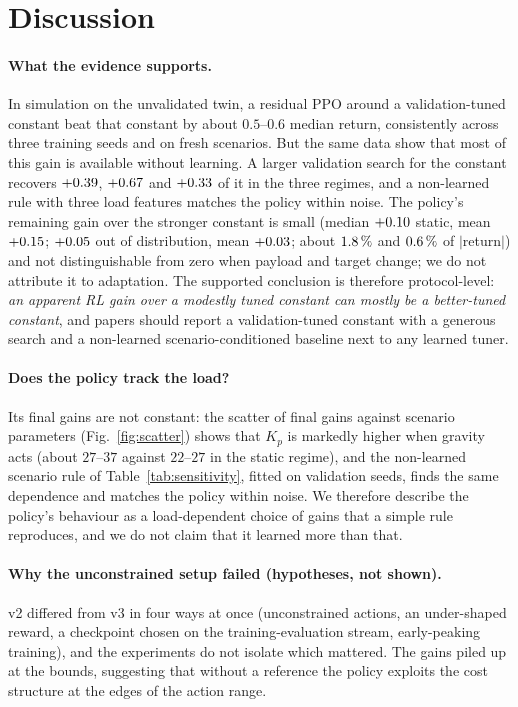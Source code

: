 \section{Discussion}
\paragraph*{What the evidence supports.} In simulation on the unvalidated twin, a residual PPO around a validation-tuned constant beat that constant by about $0.5$--$0.6$ median return, consistently across three training seeds and on fresh scenarios. But the same data show that most of this gain is available without learning. A larger validation search for the constant recovers $+0.39$, $+0.67$ and $+0.33$ of it in the three regimes, and a non-learned rule with three load features matches the policy within noise. The policy's remaining gain over the stronger constant is small (median $+0.10$ static, mean $+0.15$; $+0.05$ out of distribution, mean $+0.03$; about $1.8\,\%$ and $0.6\,\%$ of $|$return$|$) and not distinguishable from zero when payload and target change; we do not attribute it to adaptation. The supported conclusion is therefore protocol-level: \emph{an apparent RL gain over a modestly tuned constant can mostly be a better-tuned constant}, and papers should report a validation-tuned constant with a generous search and a non-learned scenario-conditioned baseline next to any learned tuner.

\paragraph*{Does the policy track the load?} Its final gains are not constant: the scatter of final gains against scenario parameters (Fig.~\ref{fig:scatter}) shows that $K_p$ is markedly higher when gravity acts (about $27$--$37$ against $22$--$27$ in the static regime), and the non-learned scenario rule of Table~\ref{tab:sensitivity}, fitted on validation seeds, finds the same dependence and matches the policy within noise. We therefore describe the policy's behaviour as a load-dependent choice of gains that a simple rule reproduces, and we do not claim that it learned more than that.

\paragraph*{Why the unconstrained setup failed (hypotheses, not shown).} v2 differed from v3 in four ways at once (unconstrained actions, an under-shaped reward, a checkpoint chosen on the training-evaluation stream, early-peaking training), and the experiments do not isolate which mattered. The gains piled up at the bounds, suggesting that without a reference the policy exploits the cost structure at the edges of the action range.

